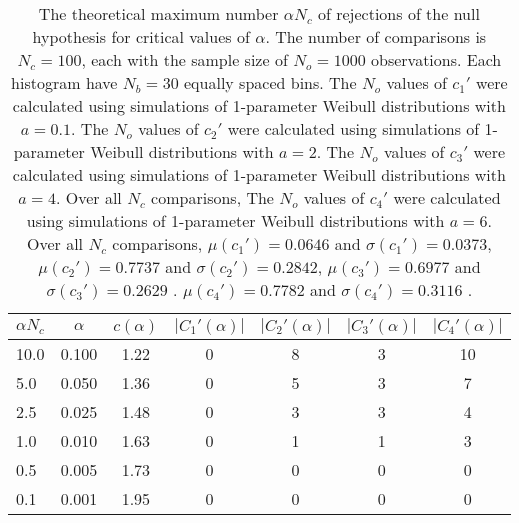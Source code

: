 \begin{table}[h!]
\begin{center}
\begin{tabular}{| l | c | c | c | c | c | c |}\hline
$\alpha N_c$ & $\alpha$ & $c(\alpha)$ & $|C_1'(\alpha)|$ & $|C_2'(\alpha)|$ & $|C_3'(\alpha)|$ & $|C_4'(\alpha)|$ \\\hline
10.0 & 0.100 & 1.22 & 0 & 8 & 3 & 10 \\\hline
5.0 & 0.050 & 1.36 & 0 & 5 & 3 & 7 \\\hline
2.5 & 0.025 & 1.48 & 0 & 3 & 3 & 4 \\\hline
1.0 & 0.010 & 1.63 & 0 & 1 & 1 & 3 \\\hline
0.5 & 0.005 & 1.73 & 0 & 0 & 0 & 0 \\\hline
0.1 & 0.001 & 1.95 & 0 & 0 & 0 & 0 \\\hline
\end{tabular}
\caption{The theoretical maximum number $\alpha N_c$ of rejections
of the null hypothesis for critical values of $\alpha$.
The number of comparisons is $N_c=100$,
each with the sample size of $N_o=1000$ observations.
Each histogram have $N_b=30$ equally spaced bins.
The $N_o$ values of $c_1'$ were calculated using simulations of
 1-parameter Weibull distributions with $a=0.1$.
The $N_o$ values of $c_2'$ were calculated using simulations of
 1-parameter Weibull distributions with $a=2$.
The $N_o$ values of $c_3'$ were calculated using simulations of
 1-parameter Weibull distributions with $a=4$.
Over all $N_c$ comparisons,
The $N_o$ values of $c_4'$ were calculated using simulations of
 1-parameter Weibull distributions with $a=6$.
Over all $N_c$ comparisons,
 $\mu(c_1')=0.0646$ and $\sigma(c_1')=0.0373$,
 $\mu(c_2')=0.7737$ and $\sigma(c_2')=0.2842$,
 $\mu(c_3')=0.6977$ and $\sigma(c_3')=0.2629$ .
 $\mu(c_4')=0.7782$ and $\sigma(c_4')=0.3116$ .
}
\end{center}
\end{table}